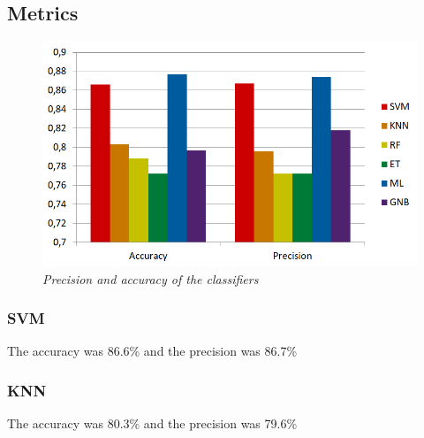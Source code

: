 \documentclass[12pt]{article}
\begin{document}
\subsection{Metrics}
\begin{figure}[!ht]
	\centering %
	\includegraphics[width=1\textwidth]{metrics.png} %
	\caption{\textit{Precision and accuracy of the classifiers}} %
	\label{fig:metrics}
\end{figure}
\subsubsection{SVM}
The accuracy was 86.6\% and the precision was 86.7\%
\subsubsection{KNN}
The accuracy was 80.3\% and the precision was 79.6\%
\end{document}

